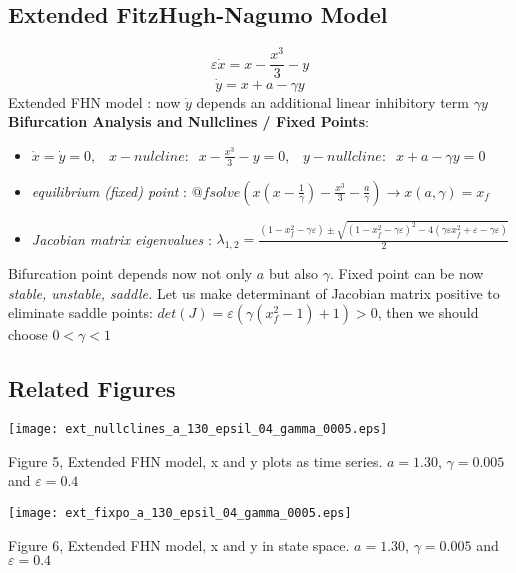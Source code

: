 \documentclass{article}
\begin{document}
\subsection{Extended FitzHugh-Nagumo Model}
\begin{equation}
 \varepsilon \dot{x} = x- \frac{x^3}{3}-y 
\end{equation}
\begin{equation}
 \dot{y}=x+a -\gamma y
\end{equation}
Extended FHN model : now $\dot y$ depends an additional linear inhibitory term $\gamma y$
\textbf{Bifurcation Analysis and Nullclines / Fixed Points}: 
\begin{itemize}
 \item $ \dot{x}=\dot{y}=0, \;\;\; x-nulcline:\;\; x- \frac{x^3}{3}-y =0, \;\;\; y-nullcline: \;\; x+a-\gamma y =0 $
\item \textit{equilibrium (fixed) point }: $ @fsolve (x(x-\frac{1}{\gamma})-\frac{x^3}{3}-\frac{a}{\gamma}) \longrightarrow x(a,\gamma)=x_f$
\item \textit{Jacobian matrix eigenvalues} : $\lambda_{1,2}=\frac{(1-x_f^2-\gamma \varepsilon)\pm \sqrt{(1-x_f^2-\gamma \varepsilon)^2 - 4 (\gamma \varepsilon x_f^2 + \varepsilon - \gamma\varepsilon)}}{2}$
\end{itemize}
Bifurcation point depends now not only $a$ but also $\gamma$. \newline
Fixed point can be now \textit{stable, unstable, saddle.} \newline
Let us make determinant of Jacobian matrix positive to eliminate saddle points: \newline
$det(J)=\varepsilon(\gamma (x_f^2-1)+1)>0$, then we should choose $0<\gamma<1$ 

\subsection{Related Figures}

\begin{center}
\texttt{[image: ext\_nullclines\_a\_130\_epsil\_04\_gamma\_0005.eps]}
\begin{footnotesize}
 Figure 5, Extended FHN model, x and y plots as time series. $a=1.30$, $\gamma=0.005$ and $\varepsilon=0.4$ 
\end{footnotesize}
\end{center}

\begin{center}
\texttt{[image: ext\_fixpo\_a\_130\_epsil\_04\_gamma\_0005.eps]}
\begin{footnotesize}
 Figure 6, Extended FHN model, x and y in state space. $a=1.30$, $\gamma=0.005$ and $\varepsilon=0.4$ 
\end{footnotesize}
\end{center}
\end{document}
